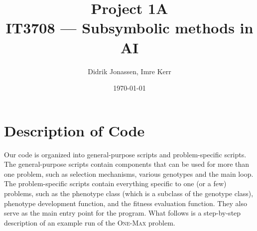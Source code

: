 \documentclass[a4paper,12pt]{article}
\author{Didrik Jonassen, Imre Kerr}
\title{Project 1A\\ IT3708 --- Subsymbolic methods in AI}
\date{\today}
\begin{document}
\maketitle

\section{Description of Code}
Our code is organized into general-purpose scripts and problem-specific scripts. The general-purpose scripts contain components that can be used for more than one problem, such as selection mechanisms, various genotypes and the main loop. The problem-specific scripts contain everything specific to one (or a few) problems, such as the phenotype class (which is a subclass of the genotype class), phenotype development function, and the fitness evaluation function. They also serve as the main entry point for the program. What follows is a step-by-step description of an example run of the \textsc{One-Max} problem.
\end{document}
